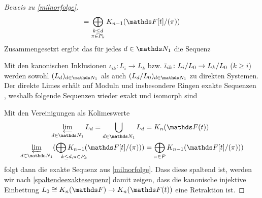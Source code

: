 \documentclass[ngerman,fontsize=11pt, paper=a4, parskip=half, titlepage=true, toc=bib]{scrartcl}
\begin{document}
\begin{proof}[Beweis zu \ref{milnorfolge}]
\begin{align}
    = \bigoplus_{\substack{k\leq d\\\pi\in P_k}}
    \K_{n-1}(\Ftpi)
  \end{align}
  Zusammengesetzt ergibt das für jedes $d\in\N_1$ die Sequenz
  \begin{center}
  \end{center}
  Mit den kanonischen Inklusionen $\iota_{ik}\colon L_i\to L_k$ 
  bzw. $\overline{\iota}_{ik}\colon L_i/L_0\to L_k/L_0$ ($k\geq i$) werden
  sowohl $(L_d)_{d\in\N_1}$ als auch $(L_d/L_0)_{d\in\N_1}$
  zu direkten Systemen.
  Der direkte Limes erhält auf Moduln und insbesondere Ringen exakte
  Sequenzen 
  \cite[siehe][III. §6.2, Prop. 3]{bourbaki},
  weshalb folgende Sequenzen wieder exakt und isomorph sind
  \begin{center}
  \end{center}
  Mit den Vereinigungen als Kolimeswerte
  \begin{align*}
    \varprojlim_{d\in\N_1}L_d
    =\bigcup_{d\in\N_1}L_d
    &=\KnFt\\
    \varprojlim_{d\in\N_1}
      (\bigoplus_{\mathrlap{k\leq d, \pi\in P_k}}
      \K_{n-1}(\Ftpi))
    &=\bigoplus_{\pi\in P}
      \K_{n-1}(\Ftpi))
  \end{align*}
  folgt dann die exakte Sequenz aus \ref{milnorfolge}.
  Dass diese spaltend ist, werden wir nach
  \ref{spaltendeexaktesequenz} damit zeigen, dass
  die kanonische injektive Einbettung $L_0\cong\KnF\to\KnFt$ 
  eine Retraktion ist.


\end{proof}
\end{document}
